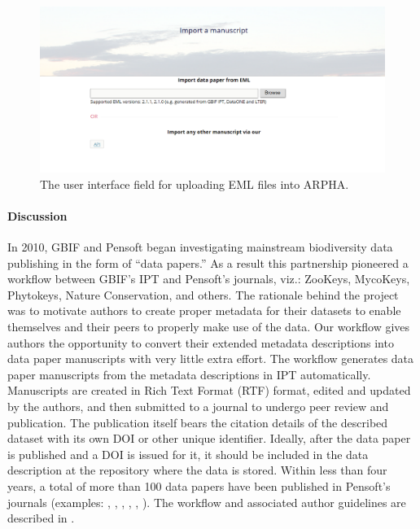 \begin{figure}
\centering
\includegraphics[width=\textwidth]{Figures/user-interface}
\decoRule
\caption{The user interface field for uploading EML files into ARPHA.}
\label{fig:user-interface}
\end{figure}

\paragraph{Discussion} In 2010, GBIF and Pensoft began investigating mainstream biodiversity data publishing in the form of ``data papers.'' As a result this partnership pioneered a workflow between GBIF’s IPT and Pensoft’s journals, viz.: ZooKeys, MycoKeys, Phytokeys, Nature Conservation, and others. The rationale behind the project was to motivate authors to create proper metadata for their datasets to enable themselves and their peers to properly make use of the data. Our workflow gives authors the opportunity to convert their extended metadata descriptions into data paper manuscripts with very little extra effort. The workflow generates data paper manuscripts from the metadata descriptions in IPT automatically. Manuscripts are created in Rich Text Format (RTF) format, edited and updated by the authors, and then submitted to a journal to undergo peer review and publication. The publication itself bears the citation details of the described dataset with its own DOI or other unique identifier. Ideally, after the data paper is published and a DOI is issued for it, it should be included in the data description at the repository where the data is stored. Within less than four years, a total of more than 100 data papers have been published in Pensoft's journals (examples: \cite{brosens_formidabel:_2013}, \cite{desmet_database_2013}, \cite{gutt_antarctic_2013}, \cite{pierrat_antarctic_2012}, \cite{shao_dataset_2012}, \cite{tng_vegetation_2016}). The workflow and associated author guidelines are described in \cite{penev_pensoft_2016}.

